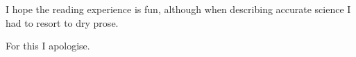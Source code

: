 I hope the reading experience is fun, although when describing accurate science I had to resort to dry prose.

For this I apologise.



